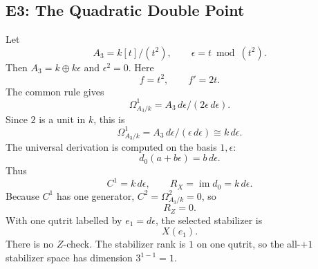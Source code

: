 \subsection{E3: The Quadratic Double Point}
Let
\[
  A_3=k[t]/(t^2),\qquad \epsilon=t\bmod(t^2).
\]
Then \(A_3=k\oplus k\epsilon\) and \(\epsilon^2=0\).  Here
\[
  f=t^2,\qquad f'=2t.
\]
The common rule gives
\[
  \Omega^1_{A_3/k}=A_3\,d\epsilon/(2\epsilon\,d\epsilon).
\]
Since \(2\) is a unit in \(k\), this is
\[
  \Omega^1_{A_3/k}=A_3\,d\epsilon/(\epsilon\,d\epsilon)
  \cong k\,d\epsilon.
\]
The universal derivation is computed on the basis \(1,\epsilon\):
\[
  d_0(a+b\epsilon)=b\,d\epsilon.
\]
Thus
\[
  C^1=k\,d\epsilon,\qquad
  R_X=\operatorname{im}d_0=k\,d\epsilon.
\]
Because \(C^1\) has one generator, \(C^2=\Omega^2_{A_3/k}=0\), so
\[
  R_Z=0.
\]
With one qutrit labelled by \(e_1=d\epsilon\), the selected stabilizer is
\[
  X(e_1).
\]
There is no \(Z\)-check.  The stabilizer rank is \(1\) on one qutrit, so the
all-\(+1\) stabilizer space has dimension \(3^{1-1}=1\).
